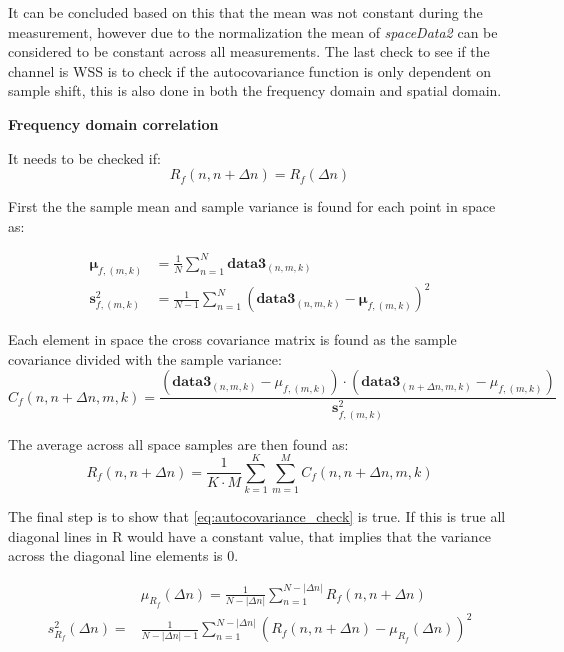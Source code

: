 It can be concluded based on this that the mean was not constant during the measurement, however due to the normalization the mean of \textit{spaceData2} can be considered to be constant across all measurements. The last check to see if the channel is \gls{WSS} is to check if the autocovariance function is only dependent on sample shift, this is also done in both the frequency domain and spatial domain.

\textbf{Frequency domain correlation}

It needs to be checked if:
\begin{equation}\label{eq:autocovariance_check}
R_f(n,n+\Delta n) = R_f(\Delta n) 
\end{equation}

First the the sample mean and sample variance is found for each point in space as:

\begin{align}
\mathbf{\mu}_{f,(m,k)} &= \frac{1}{N}\sum_{n = 1}^{N} \textbf{data3}_{(n,m,k)} \\
\textbf{s}_{f,(m,k)}^2 &= \frac{1}{N-1}\sum_{n = 1}^{N} \left( \textbf{data3}_{(n,m,k)} - \mathbf{\mu}_{f,(m,k)} \right)^2 
\end{align}

Each element in space the cross covariance matrix is found as the sample covariance divided with the sample variance:
\begin{equation}
C_f(n,n+\Delta n,m,k) = \frac{\left(\textbf{data3}_{(n,m,k)}-\mu_{f,(m,k)}\right)\cdot \left(\textbf{data3}_{(n+\Delta n,m,k)}-\mu_{f,(m,k)}\right)}{\textbf{s}_{f,(m,k)}^2}
\end{equation}

The average across all space samples are then found as:
\begin{equation}
R_f(n,n+\Delta n) = \frac{1}{K\cdot M}\sum_{k = 1}^{K}\sum_{m = 1}^{M} C_f(n,n+\Delta n,m,k)
\end{equation}


The final step is to show that \autoref{eq:autocovariance_check} is true. If this is true all diagonal lines in R would have a constant value, that implies that the variance across the diagonal line elements is 0. 

\begin{align}
&\mu_{R_f}(\Delta n) = \frac{1}{N-|\Delta n|}\sum_{n = 1}^{N-|\Delta n|} R_f(n,n+\Delta n) \label{EQcor}\\
s_{R_f}^2(\Delta n) = &\frac{1}{N-|\Delta n|-1}\sum_{n = 1}^{N-|\Delta n|} \left( R_f(n,n+\Delta n) - \mu_{R_f}(\Delta n) \right)^2 \label{eq:variance_of_covariance}
\end{align}


